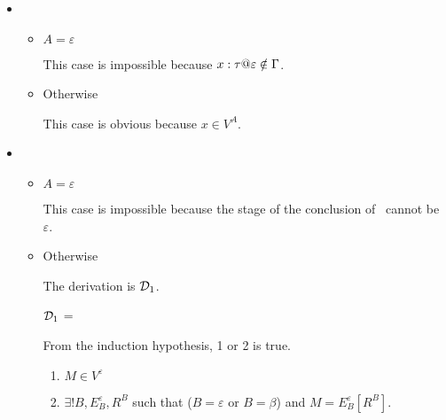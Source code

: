 \begin{itemize}
	\item \TVar
	      \begin{itemize}
	      	\item $ A = \varepsilon$
	      	      	      	      	      	      	      	      	      	      	      	      		      	      	      	      	      	      	      	      
	      	      This case is impossible because $x:\tau@\varepsilon \notin \G$.
	      	\item Otherwise
	      	      	      	      	      	      	      	      	      	      	      	      		      	      	      	      	      	      	      	      
	      	      This case is obvious because $x \in V^A$.
	      \end{itemize}
	      	      	      	      	      	      		      	      	      	      
	\item \TTBL
	      \begin{itemize}
	      	\item $ A = \varepsilon$
	      	      	      	      	      	      	      	      	      	      	      	      		      	      	      	      	      	      	      	      
	      	      This case is impossible because the stage of the conclusion of \TTBL\ cannot be $\varepsilon$.
	      	      	      	      	      	      	      	      	      	      	      	      		      	      	      	      	      	      	      	      
	      	\item Otherwise
	      	      	      	      	      	      	      	      	      	      	      	      		      	      	      	      	      	      	      	      
	      	      The derivation is $\mathcal{D}_1$.
	      	      	      	      	      	      	      	      	      	      	      	      		      	      	      	      	      	      	      	      
	      	      $\mathcal{D}_1$ = 
	      	      {}
	      	      	      	      	      	      	      	      	      	      	      	      		      	      	      	      	      	      	      	      
	      	      From the induction hypothesis, 1 or 2 is true.
	      	      \begin{enumerate}
	      	      	\item $ M \in V^\varepsilon$
	      	      	\item $\exists ! B, E^\varepsilon_B, R^B$ such that ($B = \varepsilon$ or $B = \beta$) and $M = E^\varepsilon_B[R^B]$.
	      	      \end{enumerate}
	      	      	      	      	      	      	      	      	      	      	      	      		      	      	      	      	      	      	      	      

\end{itemize}
\end{itemize}
